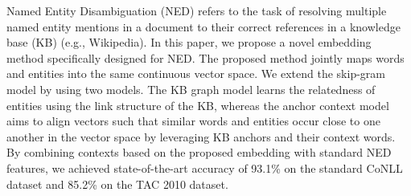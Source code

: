 Named Entity Disambiguation (NED) refers to the task of resolving multiple named entity mentions in a document to their correct references in a knowledge base (KB) (e.g., Wikipedia). In this paper, we propose a novel embedding method specifically designed for NED. The proposed method jointly maps words and entities into the same continuous vector space. We extend the skip-gram model by using two models. The KB graph model learns the relatedness of entities using the link structure of the KB, whereas the anchor context model aims to align vectors such that similar words and entities occur close to one another in the vector space by leveraging KB anchors and their context words. By combining contexts based on the proposed embedding with standard NED features, we achieved state-of-the-art accuracy of 93.1\% on the standard CoNLL dataset and 85.2\% on the TAC 2010 dataset.
